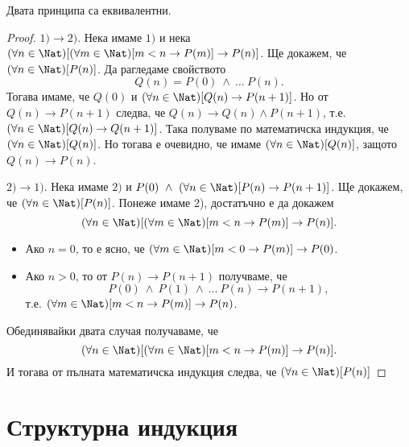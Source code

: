 \begin{prop}
  Двата принципа са еквивалентни.
\end{prop}
\begin{proof}
  $1)\to 2)$.
  Нека имаме $1)$ и нека $(\forall n\in\Nat)[(\forall m \in\Nat)[m < n \rightarrow P(m)]\rightarrow P(n)]$.
  Ще докажем, че $(\forall n \in \Nat)[P(n)]$.
  Да рагледаме свойството \[Q(n) = P(0)\ \wedge\ \dots\ P(n).\]
  Тогава имаме, че $Q(0)$ и $(\forall n\in\Nat)[Q(n) \rightarrow P(n+1)]$.
  Но от $Q(n) \rightarrow P(n+1)$ следва, че $Q(n) \rightarrow Q(n) \wedge P(n+1)$, т.е.
  $(\forall n\in\Nat)[Q(n)\rightarrow Q(n+1)]$.
  Така полуваме по математичска индукция, че $(\forall n\in\Nat)[Q(n)]$.
  Но тогава е очевидно, че имаме $(\forall n\in\Nat)[Q(n)]$,
  защото $Q(n) \rightarrow P(n)$.

  $2) \to 1)$.
  Нека имаме $2)$ и $P(0)\ \wedge\ (\forall n\in\Nat)[P(n)\rightarrow P(n+1)]$.
  Ще докажем, че $(\forall n \in \Nat)[P(n)]$.
  Понеже имаме 2), достатъчно е да докажем
  \[(\forall n\in\Nat)[(\forall m \in\Nat)[m < n \rightarrow P(m)]\rightarrow P(n)].\]
  \begin{itemize}
  \item 
    Ако $n = 0$, то е ясно, че
    $(\forall m \in\Nat)[m < 0 \rightarrow P(m)]\rightarrow P(0)$.
  \item
    Ако $n > 0$, то от $P(n)\rightarrow P(n+1)$ получваме, че 
    \[P(0)\ \wedge\ P(1)\ \wedge\ \dots\ P(n) \to P(n+1),\] т.е.
    $(\forall m \in\Nat)[m < n \rightarrow P(m)]\rightarrow P(n)$.
  \end{itemize}
  Обединявайки двата случая получаваме, че 
  \[(\forall n\in\Nat)[(\forall m \in\Nat)[m < n \rightarrow P(m)]\rightarrow P(n)].\]
  И тогава от пълната математичска индукция следва, че $(\forall n \in \Nat)[P(n)]$
\end{proof}

\section{Структурна индукция}




